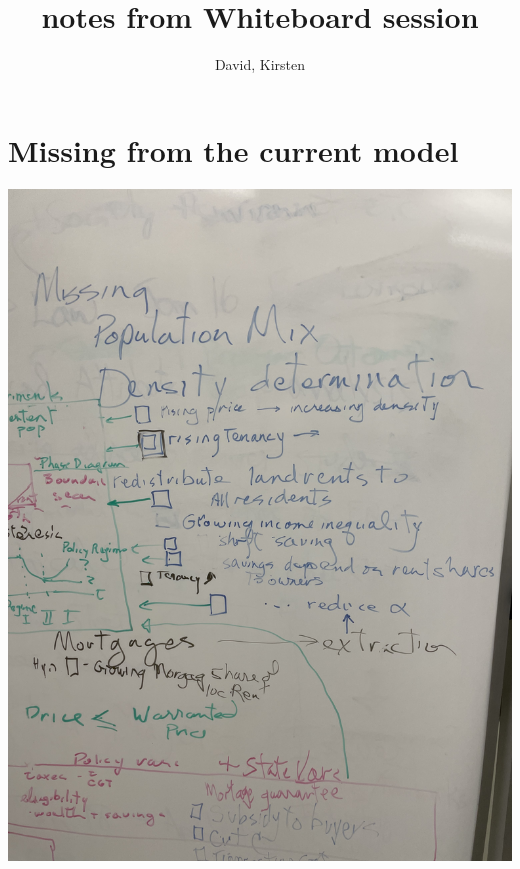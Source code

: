 \documentclass[12pt]{article}
\title{notes from Whiteboard session}
\author{David, Kirsten}
\begin{document}
\section{Missing from the current model}

\includegraphics[scale=.4, angle=-90]{IMG_2688.jpg}
\end{document}
